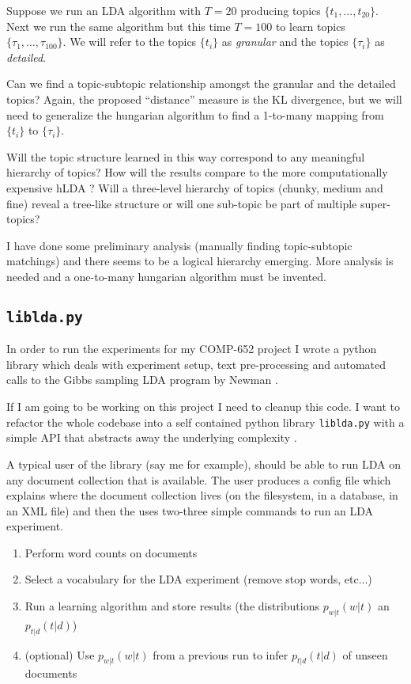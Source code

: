 \documentclass[letterpaper,11pt]{article}
\begin{document}
		Suppose we run an LDA algorithm with $T=20$ producing topics  $\{t_1,\ldots,t_{20} \}$.
		Next we run the same algorithm but this time $T=100$ to learn topics $\{\tau_1,\ldots,\tau_{100} \}$.
		We will refer to the topics $\{t_i\}$ as \emph{granular} and the topics $\{ \tau_i \}$ as \emph{detailed}.
		
		Can we find a topic-subtopic relationship amongst the granular and the detailed topics?
		Again, the proposed ``distance'' measure is the KL divergence, but we will need to generalize
		the hungarian algorithm to find a 1-to-many mapping from $\{t_i\}$ to $\{ \tau_i \}$.
		
		Will the topic structure learned in this way correspond to any meaningful hierarchy of topics?
		How will the results compare to the more computationally expensive hLDA \cite{blei2004hierarchical}?
		Will a three-level hierarchy of topics (chunky, medium and fine) reveal a tree-like structure or will one
		sub-topic be part of multiple super-topics?
		
		I have done some preliminary analysis (manually finding topic-subtopic matchings) and there 
		seems to be a  logical hierarchy emerging.
		More analysis is needed and a one-to-many hungarian algorithm must be invented.
		

	\subsection{\texttt{liblda.py}}
	
		In order to run the experiments for my COMP-652 project I wrote a python library
		which deals with experiment setup, text pre-processing and automated calls to 
		the Gibbs sampling LDA  program by Newman  \cite{NewmanCode}.
	
		If I am going to be working on this project I need to cleanup this code.
		I want to refactor the whole
		codebase into a self contained python library \texttt{liblda.py} with a simple API
		that abstracts away the underlying complexity 	\cite{IvanCode}.
		
		A typical user of the library (say me for example), should be able to run LDA
		on any document collection that is available.
	    The user produces a config file which explains where the document collection lives
	    (on the filesystem, in a database, in an XML file)
	    and then the uses two-three simple commands to run an LDA experiment.
		\begin{enumerate}
			\item  Perform word counts on documents
			\item	 Select a vocabulary for the LDA experiment (remove stop words, etc...)
			\item  Run a learning algorithm and store results (the distributions $p_{w|t}(w|t)$ an $p_{t|d}(t|d)$)
			\item  (optional) Use $p_{w|t}(w|t)$ from a previous run to infer $p_{t|d}(t|d)$ of unseen documents
		\end{enumerate}
\end{document}

